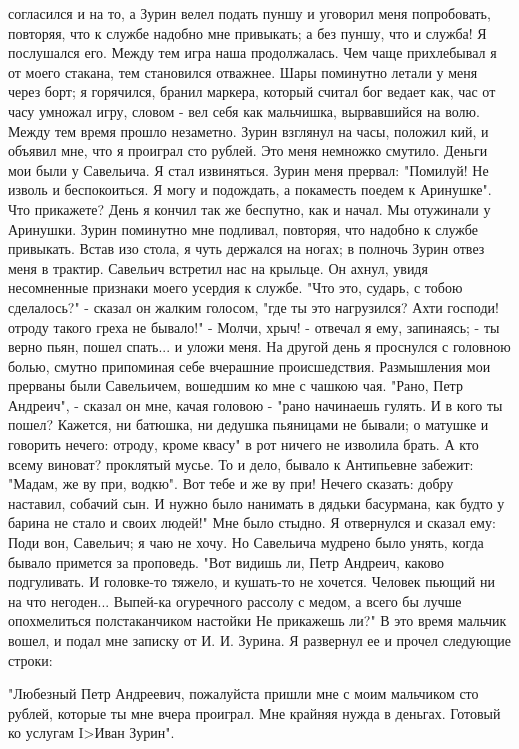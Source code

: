 согласился и на то, а Зурин  велел подать пуншу и уговорил меня попробовать,
повторяя, что к службе  надобно  мне привыкать; а без пуншу, что и служба! Я
послушался его. Между тем игра наша продолжалась.  Чем чаще прихлебывал я от
моего стакана, тем становился  отважнее. Шары поминутно летали у  меня через
борт;  я горячился, бранил маркера,  который  считал бог  ведает как, час от
часу  умножал игру, словом - вел себя  как  мальчишка,  вырвавшийся на волю.
Между тем время  прошло  незаметно. Зурин  взглянул на часы, положил кий,  и
объявил  мне, что я  проиграл сто рублей. Это меня немножко смутило.  Деньги
мои были у Савельича. Я стал извиняться. Зурин  меня прервал:  "Помилуй!  Не
изволь и беспокоиться. Я могу и подождать, а покаместь поедем к Аринушке".
Что прикажете? День я кончил так же беспутно, как и начал. Мы отужинали
у Аринушки. Зурин поминутно  мне  подливал,  повторяя, что надобно к  службе
привыкать. Встав изо стола, я чуть держался на ногах; в полночь  Зурин отвез
меня  в  трактир.  Савельич  встретил   нас  на  крыльце.  Он  ахнул,  увидя
несомненные  признаки  моего усердия  к службе. "Что  это, сударь,  с  тобою
сделалось?" -  сказал  он жалким  голосом,  "где  ты  это  нагрузился?  Ахти
господи! отроду  такого греха  не бывало!"  - Молчи, хрыч!  - отвечал я ему,
запинаясь; - ты верно пьян, пошел спать... и уложи меня.
На другой день  я проснулся  с  головною болью,  смутно припоминая себе
вчерашние происшедствия.  Размышления мои прерваны были Савельичем, вошедшим
ко мне с чашкою чая. "Рано, Петр Андреич", - сказал он мне, качая  головою -
"рано начинаешь гулять.  И  в кого ты пошел? Кажется, ни батюшка, ни дедушка
пьяницами не бывали; о матушке и говорить нечего: отроду, кроме квасу" в рот
ничего не изволила брать.  А кто всему  виноват? проклятый мусье. То и дело,
бывало к Антипьевне  забежит:  "Мадам, же ву при, водкю". Вот тебе и  же  ву
при! Нечего  сказать: добру наставил,  собачий сын. И нужно было нанимать  в
дядьки басурмана, как будто у барина не стало и своих людей!"
Мне  было стыдно. Я  отвернулся и сказал ему: Поди вон, Савельич; я чаю
не  хочу.  Но  Савельича  мудрено  было  унять,  когда  бывало  примется  за
проповедь. "Вот видишь ли, Петр  Андреич, каково  подгуливать.  И головке-то
тяжело, и кушать-то не хочется. Человек пьющий ни на что негоден... Выпей-ка
огуречного  рассолу  с медом, а всего  бы лучше опохмелиться  полстаканчиком
настойки Не прикажешь ли?"
В это  время  мальчик вошел,  и подал мне  записку от  И. И. Зурина.  Я
развернул ее и прочел следующие строки:

"Любезный Петр Андреевич,  пожалуйста  пришли мне  с моим мальчиком сто
рублей, которые ты мне вчера проиграл. Мне крайняя нужда в деньгах.
Готовый ко услугам
I>Иван Зурин".

